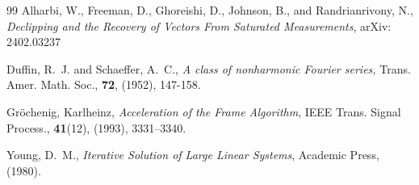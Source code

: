 \documentclass[11pt]{amsart}
\numberwithin{Theorem}{section}
\theoremstyle{definition}
\begin{document}
\begin{thebibliography}{99}
Alharbi, W., Freeman, D., Ghoreishi, D., Johnson, B., and Randrianrivony, N.,
\newblock \emph{Declipping and the Recovery of Vectors From Saturated Measurements},
\newblock arXiv: 2402.03237

Duffin, R.~J. and Schaeffer, A.~C.,
\newblock \emph{A class of nonharmonic Fourier series,} 
\newblock Trans. Amer. Math. Soc., {\bf 72}, (1952), 147-158.

Gr\"ochenig, Karlheinz,
\newblock \emph{Acceleration of the Frame Algorithm},
\newblock IEEE Trans. Signal Process., \textbf{41}(12), (1993), 3331--3340.

Young, D.~M.,
\newblock \emph{Iterative Solution of Large Linear Systems},
\newblock Academic Press, (1980).

\end{thebibliography}
\end{document}
